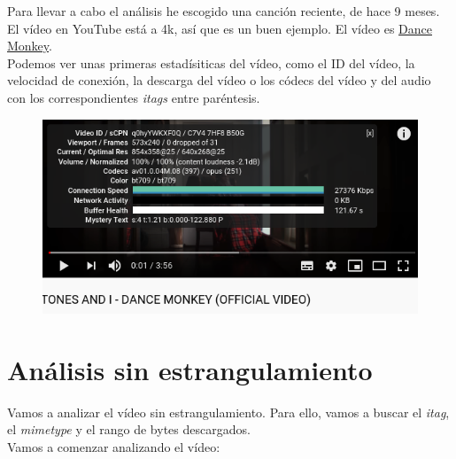 \documentclass[11pt,a4paper]{article}
\begin{document}
\newpage

Para llevar a cabo el análisis he escogido una canción reciente, de hace 9 meses. El vídeo en YouTube está a 4k, así que es un buen ejemplo. El vídeo es \color{blue} \href{https://youtu.be/q0hyYWKXF0Q}{Dance Monkey}\color{black}. \\

Podemos ver unas primeras estadísiticas del vídeo, como el ID del vídeo, la velocidad de conexión, la descarga del vídeo o los códecs del vídeo y del audio con los correspondientes \textit{itags} entre paréntesis.

\begin{figure}[H]
	\centering
	\includegraphics[scale=0.7]{img/nerds.png}
\end{figure}		

\section{Análisis sin estrangulamiento}

Vamos a analizar el vídeo sin estrangulamiento. Para ello, vamos a buscar el \textit{itag}, el \textit{mimetype} y el rango de bytes descargados.\\

Vamos a comenzar analizando el vídeo:
\end{document}
